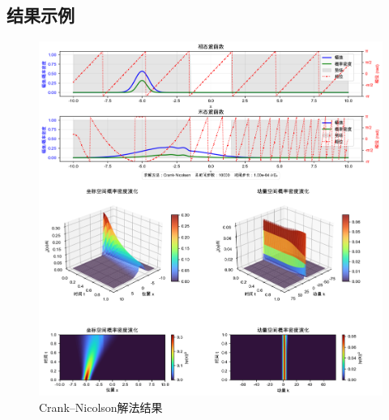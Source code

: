 \subsection{结果示例}
\begin{figure}[H]
    \centering
    \includegraphics[width=1.0\textwidth]{Problem_2/figs/cn_result.png}
    \caption{Crank–Nicolson解法结果}
\end{figure}

